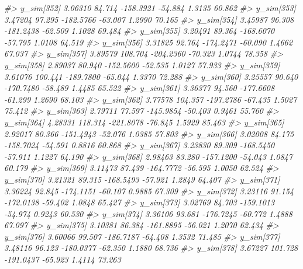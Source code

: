 \documentclass[
  10pt,
  italian,
  a4paper,
  extrafontsizes,onecolumn,openright
  ]{memoir}
\newenvironment{Shaded}{\begin{snugshade}}{\end{snugshade}}
\newcommand{\CommentTok}[1]{\textcolor[rgb]{0.56,0.35,0.01}{\textit{#1}}}
\begin{document}
\begin{Shaded}
\begin{Highlighting}[]
\CommentTok{\#\textgreater{}   y\_sim[352]  3.06310  84.714 {-}158.3921 {-}54.884  1.3135  60.862}
\CommentTok{\#\textgreater{}   y\_sim[353]  3.47204  97.295 {-}182.5766 {-}63.007  1.2990  70.165}
\CommentTok{\#\textgreater{}   y\_sim[354]  3.45987  96.308 {-}181.2438 {-}62.509  1.1028  69.484}
\CommentTok{\#\textgreater{}   y\_sim[355]  3.20491  89.364 {-}168.6070 {-}57.795  1.0108  64.519}
\CommentTok{\#\textgreater{}   y\_sim[356]  3.31825  92.764 {-}174.2471 {-}60.090  1.4662  67.037}
\CommentTok{\#\textgreater{}   y\_sim[357]  3.89579 108.704 {-}204.2360 {-}70.323  1.0744  78.358}
\CommentTok{\#\textgreater{}   y\_sim[358]  2.89037  80.940 {-}152.5600 {-}52.535  1.0127  57.933}
\CommentTok{\#\textgreater{}   y\_sim[359]  3.61076 100.441 {-}189.7800 {-}65.044  1.3370  72.288}
\CommentTok{\#\textgreater{}   y\_sim[360]  3.25557  90.640 {-}170.7480 {-}58.489  1.4485  65.522}
\CommentTok{\#\textgreater{}   y\_sim[361]  3.36377  94.560 {-}177.6608 {-}61.299  1.2690  68.103}
\CommentTok{\#\textgreater{}   y\_sim[362]  3.77578 104.357 {-}197.2786 {-}67.435  1.5027  75.412}
\CommentTok{\#\textgreater{}   y\_sim[363]  2.79711  77.597 {-}145.9854 {-}50.403  0.9461  55.760}
\CommentTok{\#\textgreater{}   y\_sim[364]  4.28331 118.314 {-}221.8078 {-}76.845  1.5929  85.463}
\CommentTok{\#\textgreater{}   y\_sim[365]  2.92017  80.366 {-}151.4943 {-}52.076  1.0385  57.803}
\CommentTok{\#\textgreater{}   y\_sim[366]  3.02008  84.175 {-}158.7024 {-}54.591  0.8816  60.868}
\CommentTok{\#\textgreater{}   y\_sim[367]  3.23830  89.309 {-}168.5450 {-}57.911  1.1227  64.190}
\CommentTok{\#\textgreater{}   y\_sim[368]  2.98463  83.280 {-}157.1200 {-}54.043  1.0847  60.179}
\CommentTok{\#\textgreater{}   y\_sim[369]  3.11473  87.439 {-}164.7772 {-}56.595  1.0050  62.524}
\CommentTok{\#\textgreater{}   y\_sim[370]  3.21321  89.315 {-}168.5493 {-}57.921  1.2849  64.407}
\CommentTok{\#\textgreater{}   y\_sim[371]  3.36224  92.845 {-}174.1151 {-}60.107  0.9885  67.309}
\CommentTok{\#\textgreater{}   y\_sim[372]  3.23116  91.154 {-}172.0138 {-}59.402  1.0848  65.427}
\CommentTok{\#\textgreater{}   y\_sim[373]  3.02769  84.703 {-}159.1013 {-}54.974  0.9243  60.530}
\CommentTok{\#\textgreater{}   y\_sim[374]  3.36106  93.681 {-}176.7245 {-}60.772  1.4888  67.097}
\CommentTok{\#\textgreater{}   y\_sim[375]  3.10381  86.384 {-}161.8895 {-}56.021  1.2070  62.434}
\CommentTok{\#\textgreater{}   y\_sim[376]  3.60066  99.507 {-}186.7187 {-}64.408  1.3532  71.485}
\CommentTok{\#\textgreater{}   y\_sim[377]  3.48116  96.123 {-}180.0377 {-}62.350  1.1880  68.736}
\CommentTok{\#\textgreater{}   y\_sim[378]  3.67227 101.728 {-}191.0437 {-}65.923  1.4114  73.263}

\end{Highlighting}
\end{Shaded}
\end{document}
